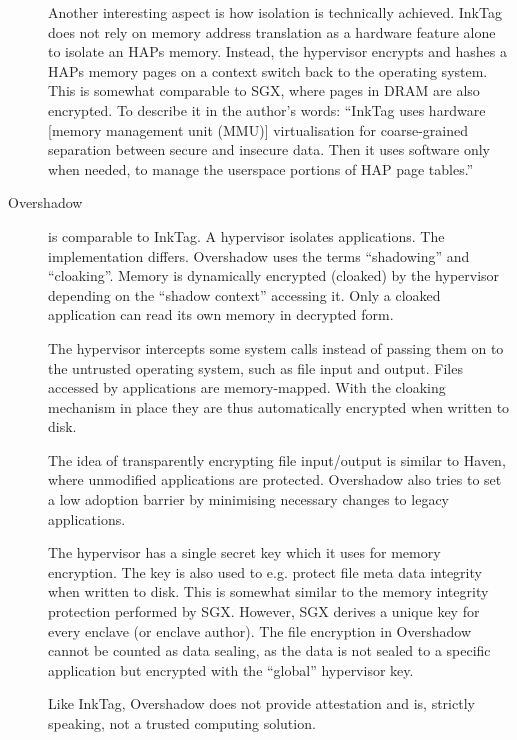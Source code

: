 \begin{description}
Another interesting aspect is how isolation is technically achieved.\label{ID_152315504}
InkTag does not rely on memory address translation as a hardware feature alone to isolate an HAPs memory.\label{ID_1866963112}
Instead, the hypervisor encrypts and hashes a HAPs memory pages on a context switch back to the operating system. This is somewhat comparable to SGX, where pages in DRAM are also encrypted.\label{ID_984786854}
To describe it in the author's words: ``InkTag uses hardware [memory management unit (MMU)] virtualisation for coarse-grained separation between secure and insecure data. Then it uses software only when needed, to manage the userspace portions of HAP page tables.''\label{ID_1124935151}
\item[Overshadow\cite{Chen2008}]\label{ID_1400272883}
is comparable to InkTag. A hypervisor isolates applications. The implementation differs.\label{ID_869320852}
Overshadow uses the terms ``shadowing'' and ``cloaking''. Memory is dynamically encrypted (cloaked) by the hypervisor depending on the ``shadow context'' accessing it.\label{ID_1595335407}
Only a cloaked application can read its own memory in decrypted form.\label{ID_213890862}

The hypervisor intercepts some system calls instead of passing them on to the untrusted operating system, such as file input and output.\label{ID_827784046}
Files accessed by applications are memory-mapped. With the cloaking mechanism in place they are thus automatically encrypted when written to disk.\label{ID_94227936}

The idea of transparently encrypting file input/output is similar to Haven, where unmodified applications are protected.\label{ID_1071753091}
Overshadow also tries to set a low adoption barrier by minimising necessary changes to legacy applications.\label{ID_5677792}

The hypervisor has a single secret key which it uses for memory encryption. The key is also used to e.g. protect file meta data integrity when written to disk.\label{ID_829303655}
This is somewhat similar to the memory integrity protection performed by SGX.\label{ID_1477727792}
However, SGX derives a unique key for every enclave (or enclave author).\label{ID_881038647}
The file encryption in Overshadow cannot be counted as data sealing, as the data is not sealed to a specific application but encrypted with the ``global'' hypervisor key.\label{ID_1562148172}

Like InkTag, Overshadow does not provide attestation and is, strictly speaking, not a trusted computing solution.\label{ID_436671458}
\end{description}\label{ID_1545531597}
